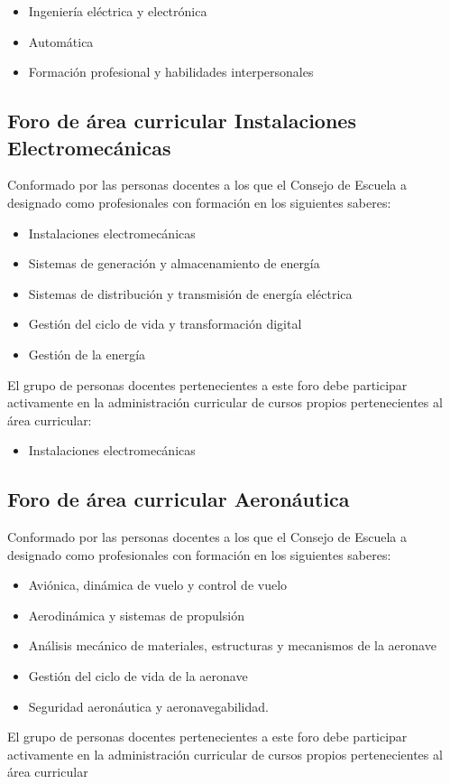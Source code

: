 \begin{itemize}
\item Ingeniería eléctrica y electrónica
\item Automática
\item Formación profesional y habilidades interpersonales
\end{itemize}
\subsection*{Foro de área curricular Instalaciones Electromecánicas}

Conformado por las personas docentes a los que el Consejo de Escuela a designado como profesionales con formación en los siguientes saberes:\par

\begin{itemize}
\item Instalaciones electromecánicas
\item Sistemas de generación y almacenamiento de energía
\item Sistemas de distribución y transmisión de energía eléctrica
\item Gestión del ciclo de vida y transformación digital
\item Gestión de la energía
\end{itemize}
El grupo de personas docentes pertenecientes a este foro debe participar activamente en la administración curricular de cursos propios pertenecientes al área curricular:\par

\begin{itemize}
\item Instalaciones electromecánicas
\end{itemize}
\subsection*{Foro de área curricular Aeronáutica}

Conformado por las personas docentes a los que el Consejo de Escuela a designado como profesionales con formación en los siguientes saberes:\par

\begin{itemize}
\item Aviónica, dinámica de vuelo y control de vuelo
\item Aerodinámica y sistemas de propulsión
\item Análisis mecánico de materiales, estructuras y mecanismos de la aeronave
\item Gestión del ciclo de vida de la aeronave
\item Seguridad aeronáutica y aeronavegabilidad.
\end{itemize}
El grupo de personas docentes pertenecientes a este foro debe participar activamente en la administración curricular de cursos propios pertenecientes al área curricular\par

